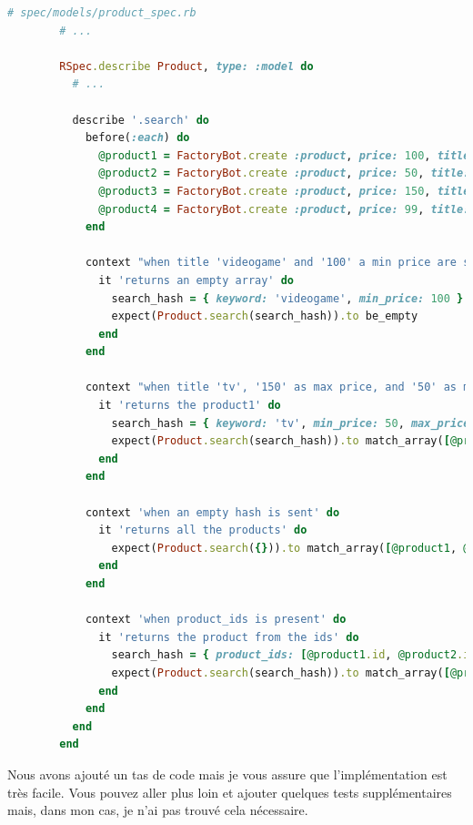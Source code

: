 \documentclass[]{report}
\begin{document}
      \begin{scriptsize}
        \begin{lstlisting}[language=ruby, caption={Test du moteur de recherche des produits}, label={lst:product_search_spec}]
        # spec/models/product_spec.rb
        # ...

        RSpec.describe Product, type: :model do
          # ...

          describe '.search' do
            before(:each) do
              @product1 = FactoryBot.create :product, price: 100, title: 'Plasma tv'
              @product2 = FactoryBot.create :product, price: 50, title: 'Videogame console'
              @product3 = FactoryBot.create :product, price: 150, title: 'MP3'
              @product4 = FactoryBot.create :product, price: 99, title: 'Laptop'
            end

            context "when title 'videogame' and '100' a min price are set" do
              it 'returns an empty array' do
                search_hash = { keyword: 'videogame', min_price: 100 }
                expect(Product.search(search_hash)).to be_empty
              end
            end

            context "when title 'tv', '150' as max price, and '50' as min price are set" do
              it 'returns the product1' do
                search_hash = { keyword: 'tv', min_price: 50, max_price: 150 }
                expect(Product.search(search_hash)).to match_array([@product1])
              end
            end

            context 'when an empty hash is sent' do
              it 'returns all the products' do
                expect(Product.search({})).to match_array([@product1, @product2, @product3, @product4])
              end
            end

            context 'when product_ids is present' do
              it 'returns the product from the ids' do
                search_hash = { product_ids: [@product1.id, @product2.id] }
                expect(Product.search(search_hash)).to match_array([@product1, @product2])
              end
            end
          end
        end
        \end{lstlisting}
      \end{scriptsize}

      Nous avons ajouté un tas de code mais je vous assure que l'implémentation est très facile. Vous pouvez aller plus loin et ajouter quelques tests supplémentaires mais, dans mon cas, je n'ai pas trouvé cela nécessaire.
\end{document}
